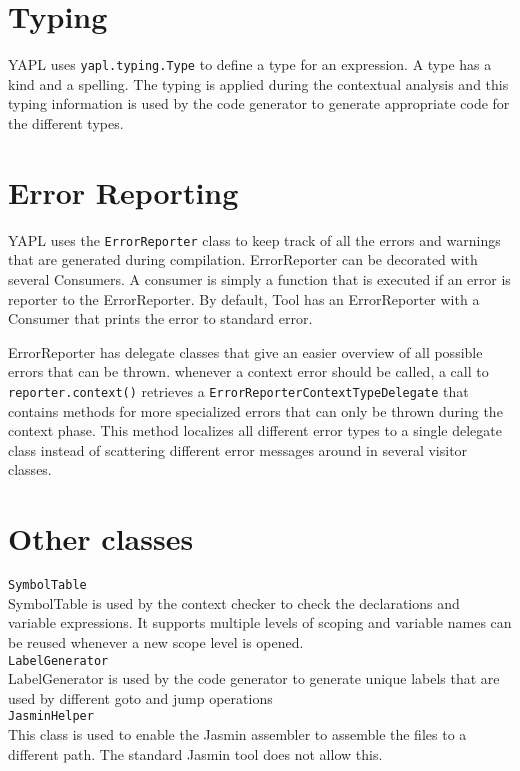\section{Typing}
YAPL uses \texttt{yapl.typing.Type} to define a type for an expression. A type has a kind and a spelling. The typing is applied during the contextual analysis and this typing information is used by the code generator to generate appropriate code for the different types.

\section{Error Reporting}
YAPL uses the \texttt{ErrorReporter} class to keep track of all the errors and warnings that are generated during compilation. ErrorReporter can be decorated with several Consumers. A consumer is simply a function that is executed if an error is reporter to the ErrorReporter. By default, Tool has an ErrorReporter with a Consumer that prints the error to standard error.

ErrorReporter has delegate classes that give an easier overview of all possible errors that can be thrown. whenever a context error should be called, a call to \texttt{reporter.context()} retrieves a \texttt{ErrorReporterContextTypeDelegate} that contains methods for more specialized errors that can only be thrown during the context phase. This method localizes all different error types to a single delegate class instead of scattering different error messages around in several visitor classes.

\section{Other classes}

\noindent\texttt{SymbolTable}\\
SymbolTable is used by the context checker to check the declarations and variable expressions. It supports multiple levels of scoping and variable names can be reused whenever a new scope level is opened.\\

\noindent\texttt{LabelGenerator}\\
LabelGenerator is used by the code generator to generate unique labels that are used by different goto and jump operations\\

\noindent\texttt{JasminHelper}\\
This class is used to enable the Jasmin assembler to assemble the files to a different path. The standard Jasmin tool does not allow this.\\

